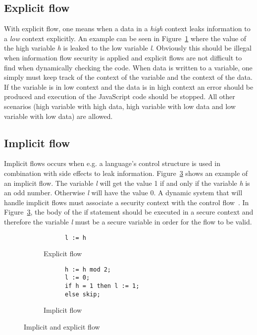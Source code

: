 \subsection{Explicit flow}
With explicit flow, one means when a data in a \emph{high} context leaks information to a \emph{low} context explicitly. An example can be seen in Figure~\ref{fig:expflow} where the value of the high variable \emph{h} is leaked to the low variable \emph{l}. Obviously this should be illegal when information flow security is applied and explicit flows are not difficult to find when dynamically checking the code. When data is written to a variable, one simply must keep track of the context of the variable and the context of the data. If the variable is in low context and the data is in high context an error should be produced and execution of the JavaScript code should be stopped. All other scenarios (high variable with high data, high variable with low data and low variable with low data) are allowed.
\subsection{Implicit flow}
\label{chapter:implicit_flow}
Implicit flows occurs when e.g. a language's control structure is used in combination with side effects to leak information. Figure~\ref{fig:impflow} shows an example of an implicit flow. The variable \emph{l} will get the value 1 if and only if the variable \emph{h} is an odd number. Otherwise \emph{l} will have the value 0. A dynamic system that will handle implicit flows must associate a security context with the control flow~\cite{jsflow-csf12}. In Figure~\ref{fig:impflow}, the body of the if statement should be executed in a secure context and therefore the variable \emph{l} must be a secure variable in order for the flow to be valid.

\begin{figure}[h]
  \captionsetup[subfigure]{singlelinecheck=off,justification=raggedright}
  \begin{subfigure}[b]{0.5\textwidth}
    \begin{verbatim}
      l := h
    \end{verbatim}
    \caption{Explicit flow}
    \label{fig:expflow}
  \end{subfigure}
  \begin{subfigure}[b]{0.5\textwidth}
    \begin{verbatim}
      h := h mod 2;
      l := 0;
      if h = 1 then l := 1;
      else skip;
    \end{verbatim}
    \caption{Implicit flow}
    \label{fig:impflow}
  \end{subfigure}
  \caption{Implicit and explicit flow}
\end{figure}

